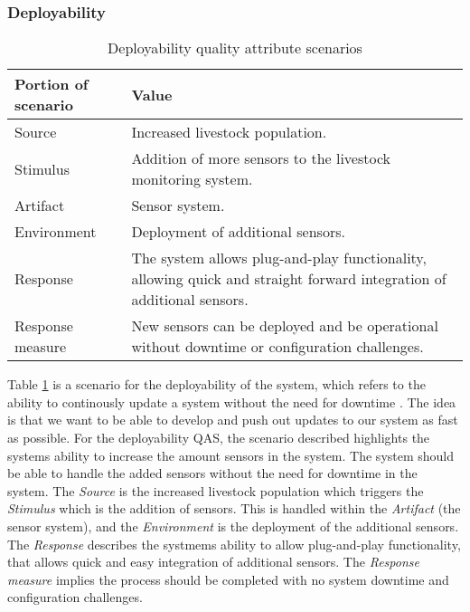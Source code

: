 \documentclass[conference]{IEEEtran}
\begin{document}
\subsubsection{Deployability}

\begin{table}[h]
    \renewcommand{\arraystretch}{1.3}
    \caption{Deployability quality attribute scenarios}
    \label{deployability}
    \centering
    \begin{tabularx}{\columnwidth}{>{\hsize=0.3\hsize}X>{\hsize=0.7\hsize}X}
        \hline
        \textbf{Portion of scenario} & \textbf{Value}                                                                                                        \\
        \hline
        Source                       & Increased livestock population.                                                                                       \\
        Stimulus                     & Addition of more sensors to the livestock monitoring system.                                                          \\
        Artifact                     & Sensor system.                                                                                                        \\
        Environment                  & Deployment of additional sensors.                                                                                     \\
        Response                     & The system allows plug-and-play functionality, allowing quick and straight forward integration of additional sensors. \\
        Response measure             & New sensors can be deployed and be operational without downtime or configuration challenges.                          \\
        \hline
    \end{tabularx}
\end{table}


Table \ref{deployability} is a scenario for the deployability of the system, which refers to the ability to continously update a system without the need for downtime \cite{bass2021software}. The idea is that we want to be able to develop and push out updates to our system as fast as possible.
For the deployability QAS, the scenario described highlights the systems ability to increase the amount sensors in the system. The system should be able to handle the added sensors without the need for downtime in the system. 
The \textit{Source} is the increased livestock population which triggers the \textit{Stimulus} which is the addition of sensors. This is handled within the \textit{Artifact} (the sensor system), and the \textit{Environment} is the deployment of the additional sensors. 
The \textit{Response} describes the systmems ability to allow plug-and-play functionality, that allows quick and easy integration of additional sensors. The \textit{Response measure} implies the process should be completed with no system downtime and configuration challenges. \newline 
\end{document}
